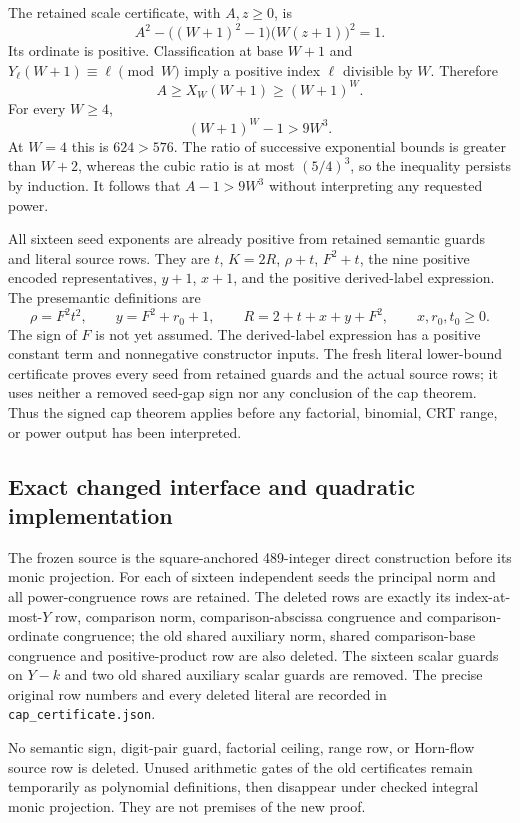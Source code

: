 The retained scale certificate, with $A,z\geq0$, is
\[
 A^2-\bigl((W+1)^2-1\bigr)\bigl(W(z+1)\bigr)^2=1.
\]
Its ordinate is positive. Classification at base $W+1$ and
$Y_\ell(W+1)\equiv\ell\pmod W$ imply a positive index $\ell$
divisible by $W$. Therefore
\[
 A\geq X_W(W+1)\geq(W+1)^W.
\]
For every $W\geq4$,
\[
 (W+1)^W-1>9W^3.
\]
At $W=4$ this is $624>576$. The ratio of successive exponential
bounds is greater than $W+2$, whereas the cubic ratio is at most
$(5/4)^3$, so the inequality persists by induction. It follows that
$A-1>9W^3$ without interpreting any requested power.

All sixteen seed exponents are already positive from retained
semantic guards and literal source rows. They are $t$, $K=2R$,
$\rho+t$, $F^2+t$, the nine positive encoded representatives,
$y+1$, $x+1$, and the positive derived-label expression. The
presemantic definitions are
\[
 \rho=F^2t^2,\qquad y=F^2+r_0+1,
 \qquad R=2+t+x+y+F^2,
 \qquad x,r_0,t_0\geq0.
\]
The sign of $F$ is not yet assumed. The derived-label expression
has a positive constant term and nonnegative constructor inputs.
The fresh literal lower-bound certificate proves every seed from
retained guards and the actual source rows; it uses neither a
removed seed-gap sign nor any conclusion of the cap theorem.
Thus the signed cap theorem applies before any factorial,
binomial, CRT range, or power output has been interpreted.

\subsection{Exact changed interface and quadratic implementation}
The frozen source is the square-anchored 489-integer direct
construction before its monic projection. For each of sixteen
independent seeds the principal norm and all power-congruence rows
are retained. The deleted rows are exactly its index-at-most-$Y$
row, comparison norm, comparison-abscissa congruence and
comparison-ordinate congruence; the old shared auxiliary norm,
shared comparison-base congruence and positive-product row are
also deleted. The sixteen scalar guards on $Y-k$ and two old
shared auxiliary scalar guards are removed. The precise original
row numbers and every deleted literal are recorded in
\texttt{cap\_certificate.json}.

No semantic sign, digit-pair guard, factorial ceiling, range row,
or Horn-flow source row is deleted. Unused arithmetic gates of
the old certificates remain temporarily as polynomial definitions,
then disappear under checked integral monic projection. They are
not premises of the new proof.

